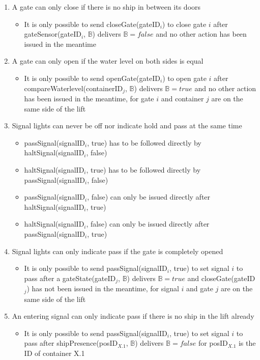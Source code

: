 \begin{enumerate}
	\item A gate can only close if there is no ship in between its doors
	\begin{itemize}
		\item It is only possible to send closeGate(gateID$_i$) to close gate $i$ after gateSensor(gateID$_i$, $\mathbb{B}$) delivers $\mathbb{B} = false$ and no other action has been issued in the meantime
	\end{itemize}
	
	\item A gate can only open if the water level on both sides is equal
	\begin{itemize}
		\item It is only possible to send openGate(gateID$_i$) to open gate $i$ after compareWaterlevel(containerID$_j$, $\mathbb{B}$) delivers $\mathbb{B} = true$ and no other action has been issued in the meantime, for gate $i$ and container $j$ are on the same side of the lift
	\end{itemize}
	
	\item Signal lights can never be off nor indicate hold and pass at the same time
		\begin{itemize}
			\item passSignal(signalID$_i$, true) has to be followed directly by \linebreak haltSignal(signalID$_i$, false)
			\item haltSignal(signalID$_i$, true) has to be followed directly by \linebreak passSignal(signalID$_i$, false)
			\item passSignal(signalID$_i$, false) can only be issued directly after \linebreak haltSignal(signalID$_i$, true)
			\item haltSignal(signalID$_i$, false) can only be issued directly after \linebreak passSignal(signalID$_i$, true)
		\end{itemize}
	\item Signal lights can only indicate pass if the gate is completely opened
		\begin{itemize}
			\item It is only possible to send passSignal(signalID$_i$, true) to set signal $i$ to pass after a gateState(gateID$_j$, $ \mathbb{B} $) delivers $\mathbb{B} = true$ and closeGate(gateID$_j$) has not been issued in the meantime, for signal $i$ and gate $j$ are on the same side of the lift
		\end{itemize}
	\item An entering signal can only indicate pass if there is no ship in the lift already
		\begin{itemize}
			\item It is only possible to send passSignal(signalID$_i$, true) to set signal $i$ to pass after shipPresence(posID$_{X.1}$, $\mathbb{B}$) delivers $\mathbb{B} = false$ for posID$_{X.1}$ is the ID of container X.1
		\end{itemize}
\end{enumerate}

